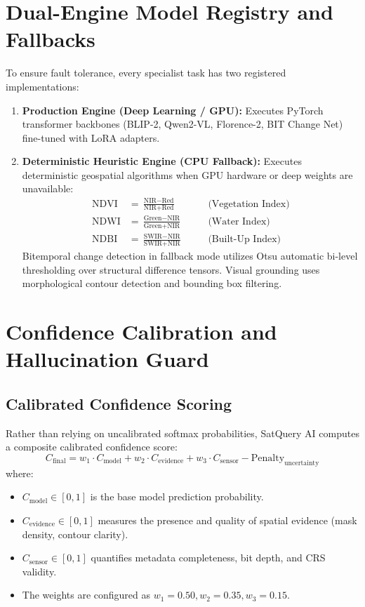 \documentclass[12pt,a4paper]{report}
\begin{document}
\section{Dual-Engine Model Registry and Fallbacks}
To ensure fault tolerance, every specialist task has two registered implementations:
\begin{enumerate}
    \item \textbf{Production Engine (Deep Learning / GPU):} Executes PyTorch transformer backbones (BLIP-2, Qwen2-VL, Florence-2, BIT Change Net) fine-tuned with LoRA adapters.
    \item \textbf{Deterministic Heuristic Engine (CPU Fallback):} Executes deterministic geospatial algorithms when GPU hardware or deep weights are unavailable:
    \begin{align}
        \text{NDVI} &= \frac{\text{NIR} - \text{Red}}{\text{NIR} + \text{Red}} \quad &&\text{(Vegetation Index)} \\
        \text{NDWI} &= \frac{\text{Green} - \text{NIR}}{\text{Green} + \text{NIR}} \quad &&\text{(Water Index)} \\
        \text{NDBI} &= \frac{\text{SWIR} - \text{NIR}}{\text{SWIR} + \text{NIR}} \quad &&\text{(Built-Up Index)}
    \end{align}
    Bitemporal change detection in fallback mode utilizes Otsu automatic bi-level thresholding over structural difference tensors. Visual grounding uses morphological contour detection and bounding box filtering.
\end{enumerate}

\section{Confidence Calibration and Hallucination Guard}

\subsection{Calibrated Confidence Scoring}
Rather than relying on uncalibrated softmax probabilities, SatQuery AI computes a composite calibrated confidence score:
\begin{equation}
    C_{\text{final}} = w_1 \cdot C_{\text{model}} + w_2 \cdot C_{\text{evidence}} + w_3 \cdot C_{\text{sensor}} - \text{Penalty}_{\text{uncertainty}}
\end{equation}
where:
\begin{itemize}
    \item $C_{\text{model}} \in [0, 1]$ is the base model prediction probability.
    \item $C_{\text{evidence}} \in [0, 1]$ measures the presence and quality of spatial evidence (mask density, contour clarity).
    \item $C_{\text{sensor}} \in [0, 1]$ quantifies metadata completeness, bit depth, and CRS validity.
    \item The weights are configured as $w_1 = 0.50, w_2 = 0.35, w_3 = 0.15$.
\end{itemize}
\end{document}
